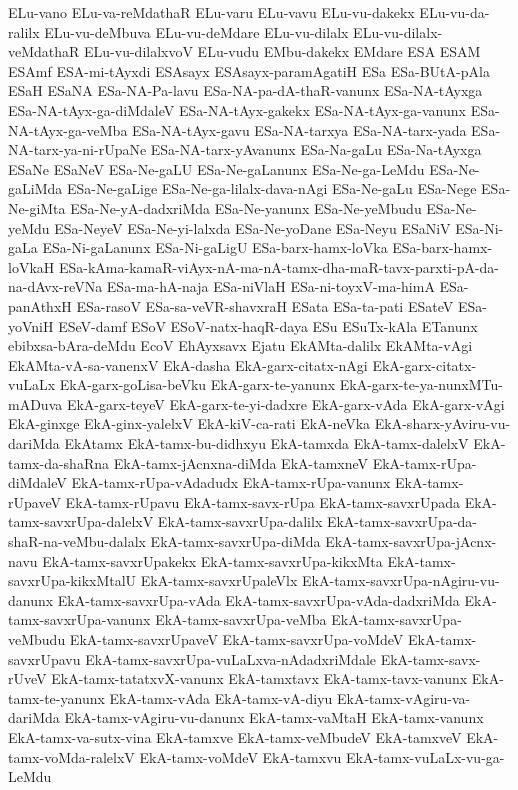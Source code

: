 {ELu-vano
ELu-va-reMdathaR
ELu-varu
ELu-vavu
ELu-vu-dakekx
ELu-vu-da-ralilx
ELu-vu-deMbuva
ELu-vu-deMdare
ELu-vu-dilalx
ELu-vu-dilalx-veMdathaR
ELu-vu-dilalxvoV
ELu-vudu
EMbu-dakekx
EMdare
ESA
ESAM
ESAmf
ESA-mi-tAyxdi
ESAsayx
ESAsayx-paramAgatiH
ESa
ESa-BUtA-pAla
ESaH
ESaNA
ESa-NA-Pa-lavu
ESa-NA-pa-dA-thaR-vanunx
ESa-NA-tAyxga
ESa-NA-tAyx-ga-diMdaleV
ESa-NA-tAyx-gakekx
ESa-NA-tAyx-ga-vanunx
ESa-NA-tAyx-ga-veMba
ESa-NA-tAyx-gavu
ESa-NA-tarxya
ESa-NA-tarx-yada
ESa-NA-tarx-ya-ni-rUpaNe
ESa-NA-tarx-yAvanunx
ESa-Na-gaLu
ESa-Na-tAyxga
ESaNe
ESaNeV
ESa-Ne-gaLU
ESa-Ne-gaLanunx
ESa-Ne-ga-LeMdu
ESa-Ne-gaLiMda
ESa-Ne-gaLige
ESa-Ne-ga-lilalx-dava-nAgi
ESa-Ne-gaLu
ESa-Nege
ESa-Ne-giMta
ESa-Ne-yA-dadxriMda
ESa-Ne-yanunx
ESa-Ne-yeMbudu
ESa-Ne-yeMdu
ESa-NeyeV
ESa-Ne-yi-lalxda
ESa-Ne-yoDane
ESa-Neyu
ESaNiV
ESa-Ni-gaLa
ESa-Ni-gaLanunx
ESa-Ni-gaLigU
ESa-barx-hamx-loVka
ESa-barx-hamx-loVkaH
ESa-kAma-kamaR-viAyx-nA-ma-nA-tamx-dha-maR-tavx-parxti-pA-da-na-dAvx-reVNa
ESa-ma-hA-naja
ESa-niVlaH
ESa-ni-toyxV-ma-himA
ESa-panAthxH
ESa-rasoV
ESa-sa-veVR-shavxraH
ESata
ESa-ta-pati
ESateV
ESa-yoVniH
ESeV-damf
ESoV
ESoV-natx-haqR-daya
ESu
ESuTx-kAla
ETanunx
ebibxsa-bAra-deMdu
EcoV
EhAyxsavx
Ejatu
EkAMta-dalilx
EkAMta-vAgi
EkAMta-vA-sa-vanenxV
EkA-dasha
EkA-garx-citatx-nAgi
EkA-garx-citatx-vuLaLx
EkA-garx-goLisa-beVku
EkA-garx-te-yanunx
EkA-garx-te-ya-nunxMTu-mADuva
EkA-garx-teyeV
EkA-garx-te-yi-dadxre
EkA-garx-vAda
EkA-garx-vAgi
EkA-ginxge
EkA-ginx-yalelxV
EkA-kiV-ca-rati
EkA-neVka
EkA-sharx-yAviru-vu-dariMda
EkAtamx
EkA-tamx-bu-didhxyu
EkA-tamxda
EkA-tamx-dalelxV
EkA-tamx-da-shaRna
EkA-tamx-jAcnxna-diMda
EkA-tamxneV
EkA-tamx-rUpa-diMdaleV
EkA-tamx-rUpa-vAdadudx
EkA-tamx-rUpa-vanunx
EkA-tamx-rUpaveV
EkA-tamx-rUpavu
EkA-tamx-savx-rUpa
EkA-tamx-savxrUpada
EkA-tamx-savxrUpa-dalelxV
EkA-tamx-savxrUpa-dalilx
EkA-tamx-savxrUpa-da-shaR-na-veMbu-dalalx
EkA-tamx-savxrUpa-diMda
EkA-tamx-savxrUpa-jAcnx-navu
EkA-tamx-savxrUpakekx
EkA-tamx-savxrUpa-kikxMta
EkA-tamx-savxrUpa-kikxMtalU
EkA-tamx-savxrUpaleVlx
EkA-tamx-savxrUpa-nAgiru-vu-danunx
EkA-tamx-savxrUpa-vAda
EkA-tamx-savxrUpa-vAda-dadxriMda
EkA-tamx-savxrUpa-vanunx
EkA-tamx-savxrUpa-veMba
EkA-tamx-savxrUpa-veMbudu
EkA-tamx-savxrUpaveV
EkA-tamx-savxrUpa-voMdeV
EkA-tamx-savxrUpavu
EkA-tamx-savxrUpa-vuLaLxva-nAdadxriMdale
EkA-tamx-savx-rUveV
EkA-tamx-tatatxvX-vanunx
EkA-tamxtavx
EkA-tamx-tavx-vanunx
EkA-tamx-te-yanunx
EkA-tamx-vAda
EkA-tamx-vA-diyu
EkA-tamx-vAgiru-va-dariMda
EkA-tamx-vAgiru-vu-danunx
EkA-tamx-vaMtaH
EkA-tamx-vanunx
EkA-tamx-va-sutx-vina
EkA-tamxve
EkA-tamx-veMbudeV
EkA-tamxveV
EkA-tamx-voMda-ralelxV
EkA-tamx-voMdeV
EkA-tamxvu
EkA-tamx-vuLaLx-vu-ga-LeMdu
}
